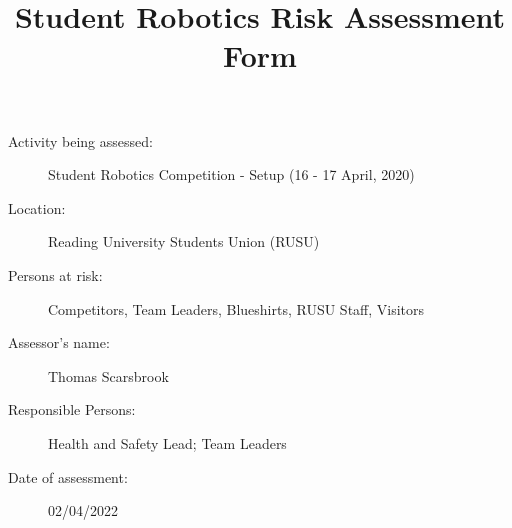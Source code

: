 \documentclass[12pt,a4paper]{scrartcl}
\title{Student Robotics Risk Assessment Form}
\begin{document}
\maketitle

\begin{description}
\item[Activity being assessed:] Student Robotics Competition - Setup (16 - 17 April, 2020)
\item[Location:] Reading University Students Union (RUSU)
\item[Persons at risk:] Competitors, Team Leaders, Blueshirts, RUSU Staff, Visitors
\end{description}

\begin{description}
\item[Assessor's name:] Thomas Scarsbrook
\item[Responsible Persons:] Health and Safety Lead; Team Leaders
\item[Date of assessment:] 02/04/2022
\end{description}
\clearpage

\newcommand{\risk}[4]{
 #1 & #2 & #3 & #4 \\
}
\end{document}

